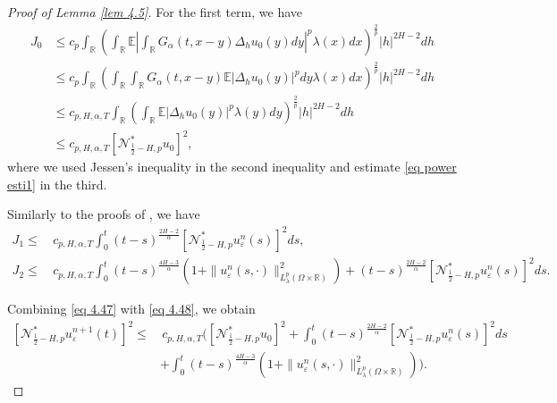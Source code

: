 \documentclass[11pt,reqno]{amsart}
\numberwithin{equation}{section}
\newcommand{\1}{{\bf 1}}
\newcommand{\2}{{\bf 2}}
\begin{document}
\begin{proof}[Proof of Lemma \ref{lem 4.5}]
 For the first term, we have
\begin{equation}\label{eq 4.48}
\begin{split}
J_0&\le c_p\int_{\mathbb{R}}\left(\int_{\mathbb{R}}\mathbb{E}\left|\int_{\mathbb{R}}G_{\alpha}(t,x-y)\Delta_hu_0(y)dy\right|^p\lambda(x)dx\right)^{\frac2p}|h|^{2H-2}dh \\
&\le c_p\int_{\mathbb{R}}\left(\int_{\mathbb{R}} \int_{\mathbb{R}}G_{\alpha}(t,x-y)\mathbb{E}|\Delta_hu_0(y)|^pdy \lambda(x)dx\right)^{\frac2p}|h|^{2H-2}dh  \\
&\le c_{p,H,\alpha,T}\int_{\mathbb{R}}\left(\int_{\mathbb{R}} \mathbb{E}|\Delta_hu_0(y)|^p \lambda(y)dy\right)^{\frac2p}|h|^{2H-2}dh  \\
&\le c_{p,H,\alpha,T}\left[\mathcal{N}_{\frac12-H,p}^*u_{0}\right]^2,
\end{split}
\end{equation}
where we used Jessen's inequality in the second inequality  and  estimate \eqref{eq power esti1}   in the   third.

Similarly to  the proofs of  \cite[(4.49)-(4.51)]{HW2022}, we have 
\begin{align*}
J_1 \le   &\, c_{p,H,\alpha,T}\int_{0}^t(t-s)^{\frac{2H-2}{\alpha}}\left[\mathcal{N}_{\frac12-H,p}^*u_{\varepsilon}^n(s)\right]^2ds,\\
J_2 \le &\, c_{p,H,\alpha,T}\int_{0}^t(t-s)^{\frac{4H-3}{\alpha}}\left(1+\|u_{\varepsilon}^n(s,\cdot)\|_{L_{\lambda}^p(\Omega\times\mathbb{R})}^2\right) +(t-s)^{\frac{2H-2}{\alpha}}\left[\mathcal{N}_{\frac12-H,p}^*u_{\varepsilon}^n(s)\right]^2ds. 
\end{align*}

Combining   \eqref{eq 4.47} with \eqref{eq 4.48}, we obtain
\begin{equation}\label{eq 4.52}
\begin{split}
\left[\mathcal{N}_{\frac12-H,p}^*u_{\varepsilon}^{n+1}(t)\right]^2 \le &\,  c_{p,H,\alpha,T}\Bigg(\left[\mathcal{N}_{\frac12-H,p}^*u_{0}\right]^2+\int_{0}^t(t-s)^{\frac{2H-2}{\alpha}}\left[\mathcal{N}_{\frac12-H,p}^*u_{\varepsilon}^n(s)\right]^2ds \\
  &+\int_{0}^t(t-s)^{\frac{4H-3}{\alpha}}\left(1+\|u_{\varepsilon}^n(s,\cdot)\|_{L_{\lambda}^p(\Omega\times\mathbb{R})}^2\right)\Bigg).
  \end{split}
\end{equation}


\end{proof}
\end{document}
